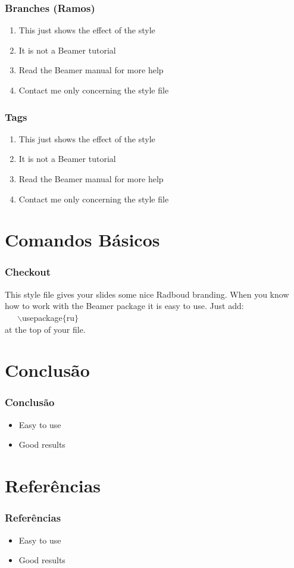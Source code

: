 \documentclass{beamer}
\begin{document}
\begin{frame}
    \frametitle{Branches (Ramos)}

    \begin{enumerate}
        \item This just shows the effect of the style
        \item It is not a Beamer tutorial
        \item Read the Beamer manual for more help
        \item Contact me only concerning the style file
    \end{enumerate}
\end{frame}

\begin{frame}
    \frametitle{Tags}

    \begin{enumerate}
        \item This just shows the effect of the style
        \item It is not a Beamer tutorial
        \item Read the Beamer manual for more help
        \item Contact me only concerning the style file
    \end{enumerate}
\end{frame}

\section{Comandos B\'asicos}

\begin{frame}
    \frametitle{Checkout}

    This style file gives your slides some nice Radboud branding.
    When you know how to work with the Beamer package it is easy to use.
    Just add:\\ ~~~$\backslash$usepackage$\{$ru$\}$ \\ at the top of your file.
\end{frame}

\section{Conclus\~ao}

\begin{frame}
    \frametitle{Conclus\~ao}

    \begin{itemize}
        \item Easy to use
        \item Good results
    \end{itemize}
\end{frame}

\section{Refer\^encias}
\begin{frame}
    \frametitle{Refer\^encias}

    \begin{itemize}
        \item Easy to use
        \item Good results
    \end{itemize}
\end{frame}
\end{document}
